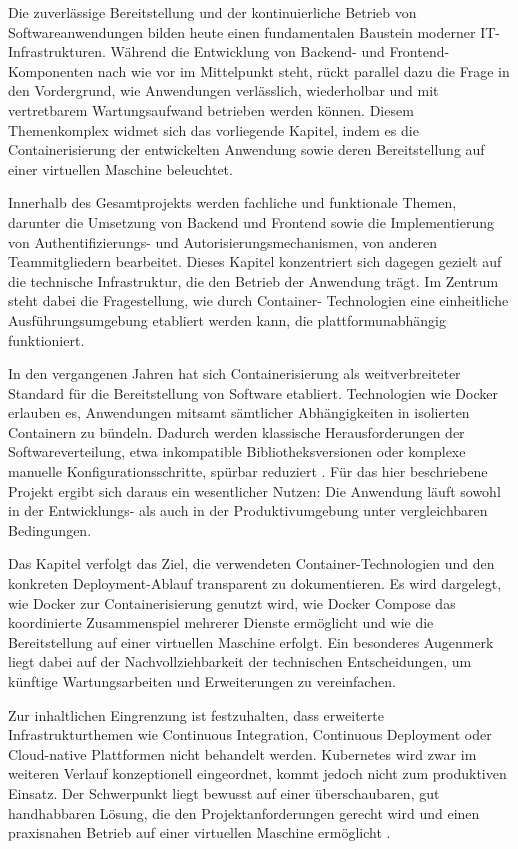 Die zuverlässige Bereitstellung und der kontinuierliche Betrieb von Softwareanwendungen 
bilden heute einen fundamentalen Baustein moderner IT-Infrastrukturen. Während die 
Entwicklung von Backend- und Frontend-Komponenten nach wie vor im Mittelpunkt steht, 
rückt parallel dazu die Frage in den Vordergrund, wie Anwendungen verlässlich, 
wiederholbar und mit vertretbarem Wartungsaufwand betrieben werden können. Diesem 
Themenkomplex widmet sich das vorliegende Kapitel, indem es die Containerisierung 
der entwickelten Anwendung sowie deren Bereitstellung auf einer virtuellen Maschine 
beleuchtet.

Innerhalb des Gesamtprojekts werden fachliche und funktionale Themen, darunter die 
Umsetzung von Backend und Frontend sowie die Implementierung von Authentifizierungs- 
und Autorisierungsmechanismen, von anderen Teammitgliedern bearbeitet. Dieses Kapitel 
konzentriert sich dagegen gezielt auf die technische Infrastruktur, die den Betrieb 
der Anwendung trägt. Im Zentrum steht dabei die Fragestellung, wie durch Container-
Technologien eine einheitliche Ausführungsumgebung etabliert werden kann, die 
plattformunabhängig funktioniert.

In den vergangenen Jahren hat sich Containerisierung als weitverbreiteter Standard 
für die Bereitstellung von Software etabliert. Technologien wie Docker erlauben es, 
Anwendungen mitsamt sämtlicher Abhängigkeiten in isolierten Containern zu bündeln. 
Dadurch werden klassische Herausforderungen der Softwareverteilung, etwa inkompatible 
Bibliotheksversionen oder komplexe manuelle Konfigurationsschritte, spürbar 
reduziert \cite{pahl2015containerization}. Für das hier beschriebene Projekt ergibt 
sich daraus ein wesentlicher Nutzen: Die Anwendung läuft sowohl in der Entwicklungs- 
als auch in der Produktivumgebung unter vergleichbaren Bedingungen.

Das Kapitel verfolgt das Ziel, die verwendeten Container-Technologien und den 
konkreten Deployment-Ablauf transparent zu dokumentieren. Es wird dargelegt, wie 
Docker zur Containerisierung genutzt wird, wie Docker Compose das koordinierte 
Zusammenspiel mehrerer Dienste ermöglicht und wie die Bereitstellung auf einer 
virtuellen Maschine erfolgt. Ein besonderes Augenmerk liegt dabei auf der 
Nachvollziehbarkeit der technischen Entscheidungen, um künftige Wartungsarbeiten 
und Erweiterungen zu vereinfachen.

Zur inhaltlichen Eingrenzung ist festzuhalten, dass erweiterte Infrastrukturthemen 
wie Continuous Integration, Continuous Deployment oder Cloud-native Plattformen 
nicht behandelt werden. Kubernetes wird zwar im weiteren Verlauf konzeptionell 
eingeordnet, kommt jedoch nicht zum produktiven Einsatz. Der Schwerpunkt liegt 
bewusst auf einer überschaubaren, gut handhabbaren Lösung, die den Projektanforderungen 
gerecht wird und einen praxisnahen Betrieb auf einer virtuellen Maschine 
ermöglicht \cite{dockerdocs}.
